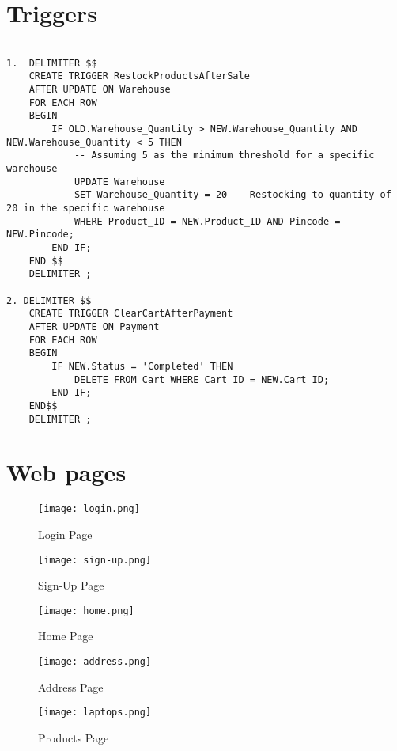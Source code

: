 \documentclass[12pt]{article}
\begin{document}
\section*{Triggers}

\begin{verbatim}

1.  DELIMITER $$
    CREATE TRIGGER RestockProductsAfterSale
    AFTER UPDATE ON Warehouse
    FOR EACH ROW
    BEGIN
        IF OLD.Warehouse_Quantity > NEW.Warehouse_Quantity AND NEW.Warehouse_Quantity < 5 THEN
            -- Assuming 5 as the minimum threshold for a specific warehouse
            UPDATE Warehouse
            SET Warehouse_Quantity = 20 -- Restocking to quantity of 20 in the specific warehouse
            WHERE Product_ID = NEW.Product_ID AND Pincode = NEW.Pincode;
        END IF;
    END $$
    DELIMITER ;

2. DELIMITER $$
    CREATE TRIGGER ClearCartAfterPayment
    AFTER UPDATE ON Payment
    FOR EACH ROW
    BEGIN
        IF NEW.Status = 'Completed' THEN
            DELETE FROM Cart WHERE Cart_ID = NEW.Cart_ID;
        END IF;
    END$$
    DELIMITER ;

\end{verbatim}

\section*{Web pages}

\begin{figure}
    \centering
    \texttt{[image: login.png]}
    \caption{Login Page}
    \label{fig:login}
\end{figure}

\begin{figure}
    \centering
    \texttt{[image: sign-up.png]}
    \caption{Sign-Up Page}
    \label{fig:signup}
\end{figure}

\begin{figure}
    \centering
    \texttt{[image: home.png]}
    \caption{Home Page}
    \label{fig:home}
\end{figure}

\begin{figure}
    \centering
    \texttt{[image: address.png]}
    \caption{Address Page}
    \label{fig:address}
\end{figure}

\begin{figure}
    \centering
    \texttt{[image: laptops.png]}
    \caption{Products Page}
    \label{fig:laptops}
\end{figure}
\end{document}
